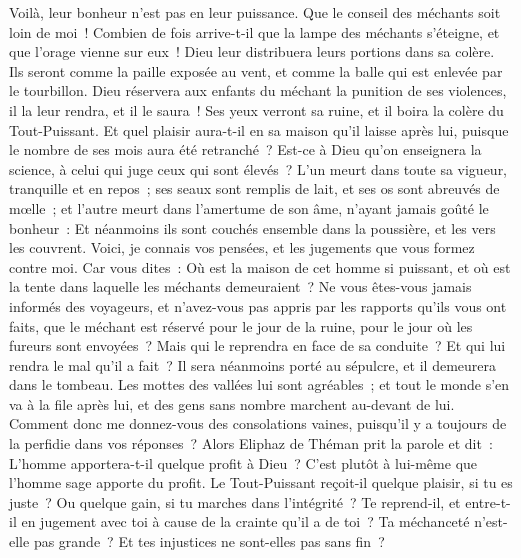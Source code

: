 \begin{multicols}{2}
Voilà, leur bonheur n'est pas en leur puissance. Que le conseil des méchants soit loin de moi~!
Combien de fois arrive-t-il que la lampe des méchants s'éteigne, et que l'orage vienne sur eux~! Dieu leur distribuera leurs portions dans sa colère.
Ils seront comme la paille exposée au vent, et comme la balle qui est enlevée par le tourbillon.
Dieu réservera aux enfants du méchant la punition de ses violences, il la leur rendra, et il le saura~!
Ses yeux verront sa ruine, et il boira la colère du Tout-Puissant.
Et quel plaisir aura-t-il en sa maison qu'il laisse après lui, puisque le nombre de ses mois aura été retranché~? 
Est-ce à Dieu qu'on enseignera la science, à celui qui juge ceux qui sont élevés~?
L'un meurt dans toute sa vigueur, tranquille et en repos~; 
ses seaux sont remplis de lait, et ses os sont abreuvés de mœlle~; 
et l'autre meurt dans l'amertume de son âme, n'ayant jamais goûté le bonheur~: 
Et néanmoins ils sont couchés ensemble dans la poussière, et les vers les couvrent. 
Voici, je connais vos pensées, et les jugements que vous formez contre moi. 
Car vous dites~: Où est la maison de cet homme si puissant, et où est la tente dans laquelle les méchants demeuraient~?
Ne vous êtes-vous jamais informés des voyageurs, et n'avez-vous pas appris par les rapports qu'ils vous ont faits,
que le méchant est réservé pour le jour de la ruine, pour le jour où les fureurs sont envoyées~?
Mais qui le reprendra en face de sa conduite~? Et qui lui rendra le mal qu'il a fait~?
Il sera néanmoins porté au sépulcre, et il demeurera dans le tombeau.
Les mottes des vallées lui sont agréables~; et tout le monde s'en va à la file après lui, et des gens sans nombre marchent au-devant de lui. 
Comment donc me donnez-vous des consolations vaines, puisqu'il y a toujours de la perfidie dans vos réponses~?
\VerseOne{}Alors Eliphaz de Théman prit la parole et dit~: 
L'homme apportera-t-il quelque profit à Dieu~? C'est plutôt à lui-même que l'homme sage apporte du profit. 
Le Tout-Puissant reçoit-il quelque plaisir, si tu es juste~? Ou quelque gain, si tu marches dans l'intégrité~?
Te reprend-il, et entre-t-il en jugement avec toi à cause de la crainte qu'il a de toi~? 
Ta méchanceté n'est-elle pas grande~? Et tes injustices ne sont-elles pas sans fin~? 

\end{multicols}

